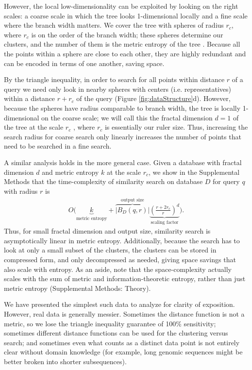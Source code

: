 \documentclass[review,preprint,12pt]{elsarticle}
\renewcommand{\cite}{\citep} %
\theoremstyle{definition}
\theoremstyle{remark}
\numberwithin{equation}{section}
\begin{document}
However, the local low-dimensionality can be exploited by looking on the right scales: a coarse scale in which the tree looks 1-dimensional locally and a fine scale where the branch width matters.
We cover the tree with spheres of radius $r_c$, where $r_c$ is on the order of the branch width; these spheres determine our clusters, and the number of them is the metric entropy of the tree \cite{tao2008product}.
Because all the points within a sphere are close to each other, they are highly 
redundant and can be encoded in terms of one another, saving space.

By the triangle inequality, in order to search for all points within distance $r$ of a query we need only look in nearby spheres with centers (i.e. representatives) within a distance $r+r_c$ of the query (Figure \ref{fig:dataStructure}d).
However, because the spheres have radius comparable to branch width, the tree is locally 1-dimensional on the coarse scale; we will call this the fractal dimension $d=1$ of the tree at the scale $r_c$ \cite{falconer1990fractal}, where $r_c$ is essentially our ruler size.
Thus, increasing the search radius for coarse search only linearly increases the number of points that need to be searched in a fine search.

A similar analysis holds in the more general case.
Given a database with fractal dimension $d$ and metric entropy $k$ at the scale $r_c$, we show in the Supplemental Methods that the time-complexity of similarity search on database $D$ for query $q$ with radius $r$ is
\begin{gather*}
    O\Bigg(
    \underbrace{k}_{\textrm{metric entropy}} +
    \overbrace{\left|B_D(q,r)\right|}^{\textrm{output size}}
    \underbrace{\left(\frac{r+2r_c}{r}\right)^d}_{\textrm{scaling factor}}
     \Bigg) .
\end{gather*}
Thus, for small fractal dimension and output size, similarity search is asymptotically linear in metric entropy.
Additionally, because the search has to look at only a small subset of the clusters, the clusters can be stored in compressed form, and only decompressed as needed, giving space savings that also scale with entropy.
As an aside, note that the space-complexity actually scales with the sum of metric and information-theoretic entropy, rather than just metric entropy 
(Supplemental Methods: Theory).

We have presented the simplest such data to analyze for clarity of exposition.
However, real data is generally messier.
Sometimes the distance function is not a metric, so we lose the triangle inequality guarantee of 100\% sensitivity;
sometimes different distance functions can be used for the clustering versus search;
and sometimes even what counts as a distinct data point is not entirely clear without domain knowledge (for example, long genomic sequences might be better broken into shorter subsequences).
\end{document}
